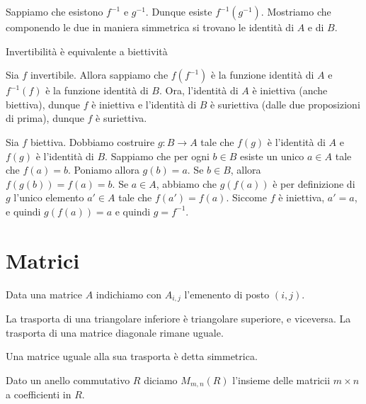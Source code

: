 \documentclass[a4paper]{article}
\begin{document}
\begin{snippetproof}{}
    Sappiamo che esistono \(f^{-1}\) e \(g^{-1}\). Dunque esiste \(f^{-1}(g^{-1})\).
    Mostriamo che componendo le due in maniera simmetrica si trovano le identità di \(A\) e di \(B\).
\end{snippetproof}

\begin{snippetproof}{Invertibilità è equivalente a biettività}
    \begin{iffproof}
        \item Sia \(f\) invertibile. Allora sappiamo che \(f(f^{-1})\) è la funzione identità di \(A\) e \(f^{-1}(f)\)
        è la funzione identità di \(B\).
        Ora, l'identità di \(A\) è iniettiva (anche biettiva), dunque \(f\) è iniettiva
        e l'identità di \(B\) è suriettiva (dalle due proposizioni di prima), dunque \(f\) è suriettiva.
        \item Sia \(f\) biettiva.
        Dobbiamo costruire \(g \colon B \to A\) tale che \(f(g)\) è l'identità di \(A\) e \(f(g)\) è l'identità di \(B\).
        Sappiamo che per ogni \(b\in B\) esiste un unico \(a\in A\) tale che
        \(f(a) = b\). Poniamo allora \(g(b)=a\). Se \(b \in B\), allora \(f(g(b)) = f(a) = b\).
        Se \(a\in A\), abbiamo che \(g(f(a))\) è per definizione di \(g\) l'unico elemento \(a'\in A\)
        tale che  \(f(a') = f(a)\). Siccome \(f\) è iniettiva, \(a'=a\), e quindi \(g(f(a)) = a\)
        e quindi \(g=f^{-1}\).
    \end{iffproof}
\end{snippetproof}


\pagebreak

\section{Matrici}

Data una matrice \(A\) indichiamo con \(A_{i,j}\) l'emenento di posto \((i,j)\).

La trasporta di una triangolare inferiore è triangolare superiore, e viceversa.
La trasporta di una matrice diagonale rimane uguale.

Una matrice uguale alla sua trasporta è detta simmetrica.

\begin{snippetdefinition}{}
    Dato un anello commutativo \(R\) diciamo \(M_{m,n}(R)\) l'insieme delle matricii \(m \times n\)
    a coefficienti in \(R\).
\end{snippetdefinition}
\end{document}
